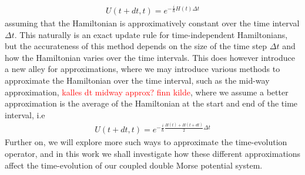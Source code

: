 \documentclass{subfiles}
\begin{document}
\begin{align*}
    U(t + dt, t) = e^{-\frac{i}{\hbar}H(t)\Delta t}
\end{align*}
assuming that the Hamiltonian is approximatively constant over the time interval $\Delta t$. This naturally is an exact update rule for time-independent Hamiltonians, but the accurateness of this method depends on the size of the time step $\Delta t$ and how the Hamiltonian varies over the time intervals. This does however introduce a new alley for approximations, where we may introduce various methods to approximate the Hamiltonian over the time interval, such as the mid-way approximation, \textcolor{red}{kalles dt midway approx? finn kilde}, where we assume a better approximation is the average of the Hamiltonian at the start and end of the time interval, i.e
\begin{align*}
    U(t + dt, t) = e^{-\frac{i}{\hbar}\frac{H(t) + H(t + dt)}{2}\Delta t}
\end{align*}
Further on, we will explore more such ways to approximate the time-evolution operator, and in this work we shall investigate how these different approximations affect the time-evolution of our coupled double Morse potential system. \\ \\
\end{document}
